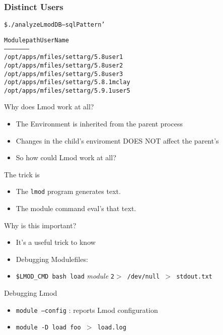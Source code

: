 \documentclass[dvipsnames,aspectratio=169]{beamer}
\begin{document}
\begin{frame}[fragile]
    \frametitle{Distinct Users}
  {\small
    \begin{alltt}
\$ ./analyzeLmodDB --sqlPattern '%/settarg/%' usernames

Module path                       User Name
-----------                       ---------
/opt/apps/mfiles/settarg/5.8      user1
/opt/apps/mfiles/settarg/5.8      user2
/opt/apps/mfiles/settarg/5.8      user3
/opt/apps/mfiles/settarg/5.8.1    mclay
/opt/apps/mfiles/settarg/5.9.1    user5
    \end{alltt}
}
\end{frame}

\begin{frame}{Why does Lmod work at all?}
  \begin{itemize}
    \item The Environment is inherited from the parent process
    \item Changes in the child's enviroment DOES NOT affect the
      parent's
    \item So how could Lmod work at all? 
  \end{itemize}
\end{frame}

\begin{frame}{The trick is}
  \begin{itemize}
    \item The \texttt{lmod} program generates text.
    \item The module command eval's that text.
  \end{itemize}
\end{frame}

\begin{frame}{Why is this important?}
  \begin{itemize}
    \item It's a useful trick to know
    \item Debugging Modulefiles:
    \item \texttt{\$LMOD\_CMD bash load} \emph{module} \texttt{2$>$
        /dev/null $>$ stdout.txt}
  \end{itemize}
\end{frame}

\begin{frame}{Debugging Lmod}
  \begin{itemize}
    \item \texttt{module --config} : reports Lmod configuration
    \item \texttt{module -D load foo $>$ load.log}
  \end{itemize}
\end{frame}
\end{document}
